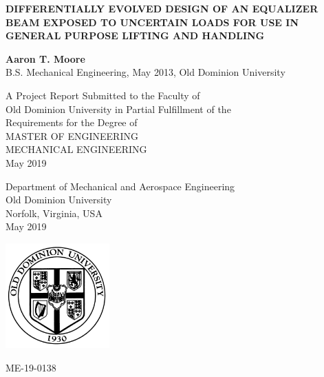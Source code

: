 \begin{titlepage}
   \begin{center}
       
       \Large
	   {\uppercase{\textbf{Differentially Evolved Design of an Equalizer Beam Exposed to Uncertain Loads for use in General Purpose Lifting and Handling}}\par}
       \normalsize

       \vspace{1.5cm}
 
       \textbf{Aaron T. Moore}\\
       B.S. Mechanical Engineering, May 2013, Old Dominion University
 
       \vspace{1.0cm}
 
       A Project Report Submitted to the Faculty of\\
       Old Dominion University in Partial Fulfillment of the\\
       Requirements for the Degree of\\
       \vspace{1.0cm}
       \uppercase{Master of Engineering}\\
       \vspace{1em}
       \uppercase{Mechanical Engineering}\\
       \vspace{1em}
       {May 2019}\\

 
       \vspace{0.8cm}
 

       Department of Mechanical  and Aerospace Engineering\\
       Old Dominion University\\
       Norfolk, Virginia, USA\\
       May 2019
       
       \vspace{1cm}
       \includegraphics[width=0.3\textwidth]{img/logo.jpg}

       \vfill
       ME-19-0138 
   \end{center}
\end{titlepage}
